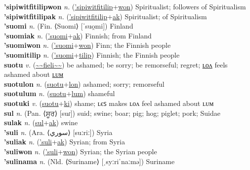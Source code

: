 \textbf{'sipiwitfitilipwon} \textit{n.} (\hyperref['sipiwitfitilip]{'sipiwitfitilip}+\hyperref[won]{won})
Spiritualist; followers of Spiritualism \label{'sipiwitfitilipwon} \\
\textbf{'sipiwitfitilipak} \textit{n.} (\hyperref['sipiwitfitilip]{'sipiwitfitilip}+\hyperref[ak]{ak})
Spiritualist; of Spiritualism \label{'sipiwitfitilipak} \\
\textbf{'suomi} \textit{n.} (Fin. ⟨Suomi⟩ [ˈsuo̯mi])
Finland \label{'suomi} \\
\textbf{'suomiak} \textit{n.} (\hyperref['suomi]{'suomi}+\hyperref[ak]{ak})
Finnish; from Finland \label{'suomiak} \\
\textbf{'suomiwon} \textit{n.} (\hyperref['suomi]{'suomi}+\hyperref[won]{won})
Finn; the Finnish people \label{'suomiwon} \\
\textbf{'suomitilip} \textit{n.} (\hyperref['suomi]{'suomi}+\hyperref[tilip]{tilip})
Finnish; the Finnish people \label{'suomitilip} \\
\textbf{suotu} \textit{v.} (\hyperref[fieli]{\~{}\~{}fieli\~{}\~{}})
be ashamed; be sorry; be remorseful; regret; \hyperref[suotulon]{ʟᴏᴧ} feels ashamed about \hyperref[suotulum]{ʟᴜᴍ} \label{suotu} \\
\textbf{suotulon} \textit{n.} (\hyperref[suotu]{suotu}+\hyperref[lon]{lon})
ashamed; sorry; remorseful \label{suotulon} \\
\textbf{suotulum} \textit{n.} (\hyperref[suotu]{suotu}+\hyperref[lum]{lum})
shameful \label{suotulum} \\
\textbf{suotuki} \textit{v.} (\hyperref[suotu]{suotu}+\hyperref[ki]{ki})
shame; ʟєꜱ makes ʟᴏᴧ feel ashamed about ʟᴜᴍ \label{suotuki} \\
\textbf{sul} \textit{n.} (Pan. ⟨ਸੂਰ⟩ [suɾ])
suid; swine; boar; pig; hog; piglet; pork; Suidae \label{sul} \\
\textbf{sulak} \textit{n.} (\hyperref[sul]{sul}+\hyperref[ak]{ak})
swine \label{sulak} \\
\textbf{'suli} \textit{n.} (Ara. ⟨سوري‎⟩ [suːriː])
Syria \label{'suli} \\
\textbf{'suliak} \textit{n.} (\hyperref['suli]{'suli}+\hyperref[ak]{ak})
Syrian; from Syria \label{'suliak} \\
\textbf{'suliwon} \textit{n.} (\hyperref['suli]{'suli}+\hyperref[won]{won})
Syrian; the Syrian people \label{'suliwon} \\
\textbf{'sulinama} \textit{n.} (Nld. ⟨Suriname⟩ [ˌsyːriˈnaːmə])
Suriname \label{'sulinama} \\
